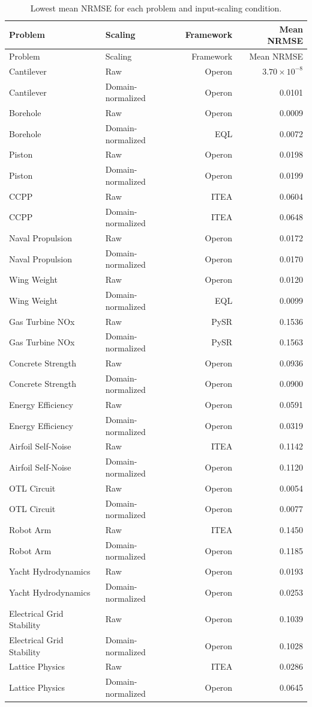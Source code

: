 \documentclass[12pt,oneside,bibtotoc,liststotoc]{scrbook}
\begin{document}
\begin{longtable}{llrr}
\caption{Lowest mean NRMSE for each problem and input-scaling condition.}\label{tab:results-problem-winners}\\
\toprule
Problem & Scaling & Framework & Mean NRMSE \\
\midrule
\endfirsthead
\toprule
Problem & Scaling & Framework & Mean NRMSE \\
\midrule
\endhead
Cantilever & Raw & Operon & $3.70\times10^{-8}$ \\
Cantilever & Domain-normalized & Operon & 0.0101 \\
Borehole & Raw & Operon & 0.0009 \\
Borehole & Domain-normalized & EQL & 0.0072 \\
Piston & Raw & Operon & 0.0198 \\
Piston & Domain-normalized & Operon & 0.0199 \\
CCPP & Raw & ITEA & 0.0604 \\
CCPP & Domain-normalized & ITEA & 0.0648 \\
Naval Propulsion & Raw & Operon & 0.0172 \\
Naval Propulsion & Domain-normalized & Operon & 0.0170 \\
Wing Weight & Raw & Operon & 0.0120 \\
Wing Weight & Domain-normalized & EQL & 0.0099 \\
Gas Turbine NOx & Raw & PySR & 0.1536 \\
Gas Turbine NOx & Domain-normalized & PySR & 0.1563 \\
Concrete Strength & Raw & Operon & 0.0936 \\
Concrete Strength & Domain-normalized & Operon & 0.0900 \\
Energy Efficiency & Raw & Operon & 0.0591 \\
Energy Efficiency & Domain-normalized & Operon & 0.0319 \\
Airfoil Self-Noise & Raw & ITEA & 0.1142 \\
Airfoil Self-Noise & Domain-normalized & Operon & 0.1120 \\
OTL Circuit & Raw & Operon & 0.0054 \\
OTL Circuit & Domain-normalized & Operon & 0.0077 \\
Robot Arm & Raw & ITEA & 0.1450 \\
Robot Arm & Domain-normalized & Operon & 0.1185 \\
Yacht Hydrodynamics & Raw & Operon & 0.0193 \\
Yacht Hydrodynamics & Domain-normalized & Operon & 0.0253 \\
Electrical Grid Stability & Raw & Operon & 0.1039 \\
Electrical Grid Stability & Domain-normalized & Operon & 0.1028 \\
Lattice Physics & Raw & ITEA & 0.0286 \\
Lattice Physics & Domain-normalized & Operon & 0.0645 \\
\bottomrule
\end{longtable}
\end{document}
